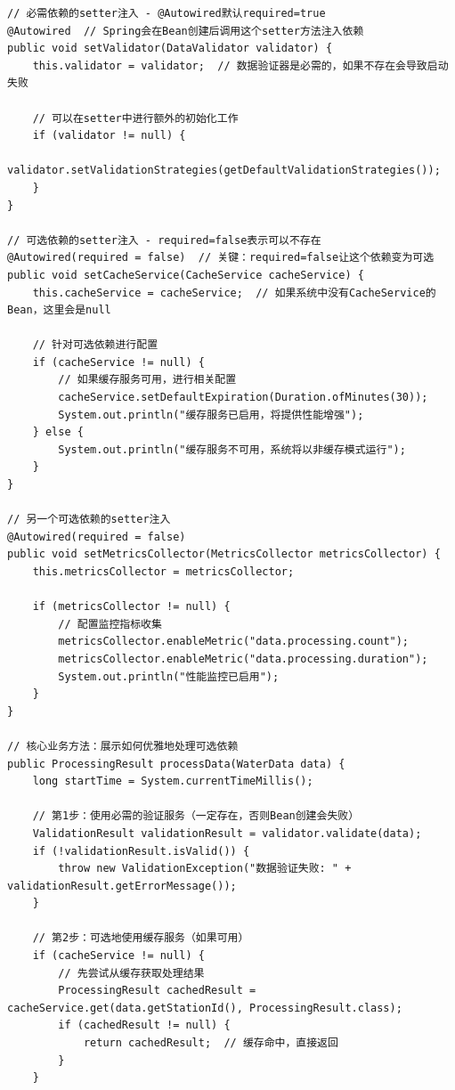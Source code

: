\begin{verbatim}
// 必需依赖的setter注入 - @Autowired默认required=true
@Autowired  // Spring会在Bean创建后调用这个setter方法注入依赖
public void setValidator(DataValidator validator) {
    this.validator = validator;  // 数据验证器是必需的，如果不存在会导致启动失败
    
    // 可以在setter中进行额外的初始化工作
    if (validator != null) {
        validator.setValidationStrategies(getDefaultValidationStrategies());
    }
}

// 可选依赖的setter注入 - required=false表示可以不存在
@Autowired(required = false)  // 关键：required=false让这个依赖变为可选
public void setCacheService(CacheService cacheService) {
    this.cacheService = cacheService;  // 如果系统中没有CacheService的Bean，这里会是null
    
    // 针对可选依赖进行配置
    if (cacheService != null) {
        // 如果缓存服务可用，进行相关配置
        cacheService.setDefaultExpiration(Duration.ofMinutes(30));
        System.out.println("缓存服务已启用，将提供性能增强");
    } else {
        System.out.println("缓存服务不可用，系统将以非缓存模式运行");
    }
}

// 另一个可选依赖的setter注入
@Autowired(required = false)
public void setMetricsCollector(MetricsCollector metricsCollector) {
    this.metricsCollector = metricsCollector;
    
    if (metricsCollector != null) {
        // 配置监控指标收集
        metricsCollector.enableMetric("data.processing.count");
        metricsCollector.enableMetric("data.processing.duration");
        System.out.println("性能监控已启用");
    }
}

// 核心业务方法：展示如何优雅地处理可选依赖
public ProcessingResult processData(WaterData data) {
    long startTime = System.currentTimeMillis();
    
    // 第1步：使用必需的验证服务（一定存在，否则Bean创建会失败）
    ValidationResult validationResult = validator.validate(data);
    if (!validationResult.isValid()) {
        throw new ValidationException("数据验证失败: " + validationResult.getErrorMessage());
    }
    
    // 第2步：可选地使用缓存服务（如果可用）
    if (cacheService != null) {
        // 先尝试从缓存获取处理结果
        ProcessingResult cachedResult = cacheService.get(data.getStationId(), ProcessingResult.class);
        if (cachedResult != null) {
            return cachedResult;  // 缓存命中，直接返回
        }
    }
    

\end{verbatim}
